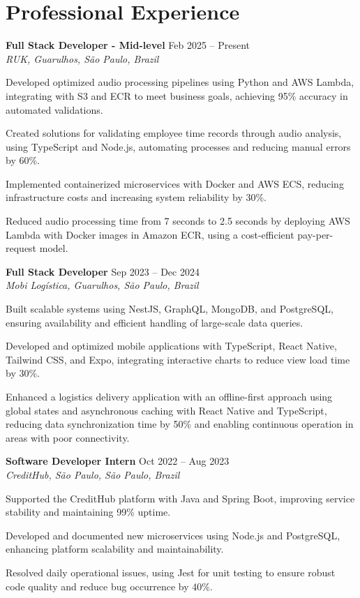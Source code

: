 \documentclass[11pt,letterpaper]{article}
\begin{document}
\section{Professional Experience}

\textbf{Full Stack Developer - Mid-level} \hfill Feb 2025 – Present \\
\textit{RUK, Guarulhos, São Paulo, Brazil}
\begin{achievements}
    \item Developed optimized audio processing pipelines using Python and AWS Lambda, integrating with S3 and ECR to meet business goals, achieving 95\% accuracy in automated validations.
    \item Created solutions for validating employee time records through audio analysis, using TypeScript and Node.js, automating processes and reducing manual errors by 60\%.
    \item Implemented containerized microservices with Docker and AWS ECS, reducing infrastructure costs and increasing system reliability by 30\%.
    \item Reduced audio processing time from 7 seconds to 2.5 seconds by deploying AWS Lambda with Docker images in Amazon ECR, using a cost-efficient pay-per-request model.
\end{achievements}

\textbf{Full Stack Developer} \hfill Sep 2023 – Dec 2024 \\
\textit{Mobi Logística, Guarulhos, São Paulo, Brazil}
\begin{achievements}
    \item Built scalable systems using NestJS, GraphQL, MongoDB, and PostgreSQL, ensuring availability and efficient handling of large-scale data queries.
    \item Developed and optimized mobile applications with TypeScript, React Native, Tailwind CSS, and Expo, integrating interactive charts to reduce view load time by 30\%.
    \item Enhanced a logistics delivery application with an offline-first approach using global states and asynchronous caching with React Native and TypeScript, reducing data synchronization time by 50\% and enabling continuous operation in areas with poor connectivity.
\end{achievements}

\textbf{Software Developer Intern} \hfill Oct 2022 – Aug 2023 \\
\textit{CreditHub, São Paulo, São Paulo, Brazil}
\begin{achievements}
    \item Supported the CreditHub platform with Java and Spring Boot, improving service stability and maintaining 99\% uptime.
    \item Developed and documented new microservices using Node.js and PostgreSQL, enhancing platform scalability and maintainability.
    \item Resolved daily operational issues, using Jest for unit testing to ensure robust code quality and reduce bug occurrence by 40\%.
\end{achievements}
\end{document}
